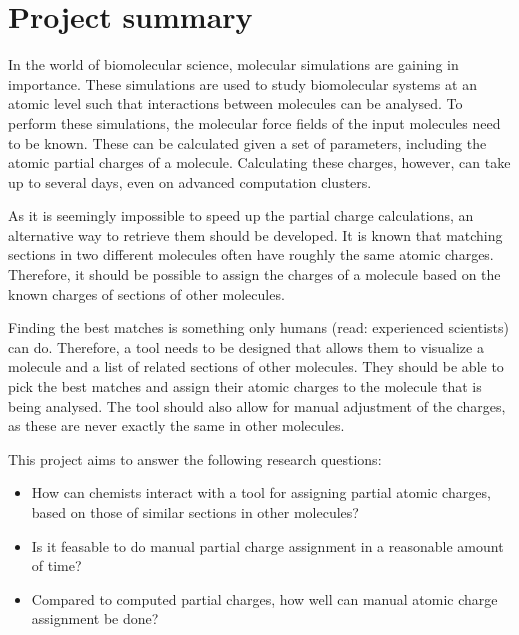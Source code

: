 \chapter{Project summary}
In the world of biomolecular science, molecular simulations are gaining in importance. These simulations are used to study biomolecular systems at an atomic level such that interactions between molecules can be analysed. To perform these simulations, the molecular force fields of the input molecules need to be known. These can be calculated given a set of parameters, including the atomic partial charges of a molecule. Calculating these charges, however, can take up to several days, even on advanced computation clusters.

As it is seemingly impossible to speed up the partial charge calculations, an alternative way to retrieve them should be developed. It is known that matching sections in two different molecules often have roughly the same atomic charges. Therefore, it should be possible to assign the charges of a molecule based on the known charges of sections of other molecules.

Finding the best matches is something only humans (read: experienced scientists) can do. Therefore, a tool needs to be designed that allows them to visualize a molecule and a list of related sections of other molecules. They should be able to pick the best matches and assign their atomic charges to the molecule that is being analysed. The tool should also allow for manual adjustment of the charges, as these are never exactly the same in other molecules.

This project aims to answer the following research questions:
\begin{itemize}
\item How can chemists interact with a tool for assigning partial atomic charges, based on those of similar sections in other molecules?
\item Is it feasable to do manual partial charge assignment in a reasonable amount of time?
\item Compared to computed partial charges, how well can manual atomic charge assignment be done?
\end{itemize}
